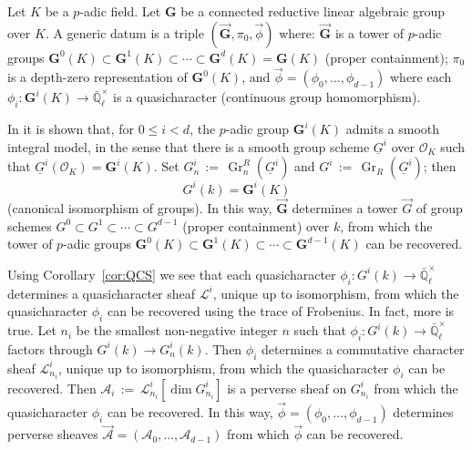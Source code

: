 \documentclass[10pt]{amsart}
\theoremstyle{plain}
\theoremstyle{definition}
\newcommand{\EE}{\mathbb{\bar Q}_\ell}
\newcommand{\OK}{\mathcal{O}_K}
\newcommand{\Fq}{k}
\newcommand{\EEx}{\EE^\times}
\newcommand{\G}{\textbf{G}}
\DeclareMathOperator{\Gr}{Gr}
\newcommand{\ceq}{{\, :=\, }}
\newcommand{\cs}[1]{{\mathcal{#1}}}
\begin{document}
Let $K$ be a $p$-adic field. Let $\G$ be a connected reductive linear algebraic group over $K$. 
A generic datum is a triple $(\vec{\G}, \pi_0, \vec{\phi})$ where: $\vec{\G}$ is a tower of $p$-adic groups $\G^0(K) \subset \G^1(K) \subset \cdots  \subset \G^d(K) = \G(K)$ (proper containment); $\pi_0$ is a depth-zero representation of $\G^0(K)$, and $\vec{\phi} = (\phi_0, \ldots , \phi_{d-1})$ where each $\phi_i : \G^i(K) \to \EEx$ is a quasicharacter (continuous group homomorphism).  


In \cite{yu:03a} it is shown that, for $0 \leq i < d$, the $p$-adic group $\G^i(K)$ admits a smooth integral model, in the sense that there is  a smooth group scheme $\underline{G}^i$ over $\OK$ such that $\underline{G}^i(\OK) = \G^i(K)$.
Set $G^i_n \ceq \Gr^R_n(\underline{G}^i)$ and $G^i \ceq \Gr_R(\underline{G}^i)$; 
then \[G^i(\Fq) = \G^i(K)\] (canonical isomorphism of groups).
In this way, $\vec{\G}$ determines a tower $\vec{G}$ of group schemes $G^0 \subset G^1 \subset \cdots  \subset G^{d-1}$ (proper containment) over $\Fq$, from which the tower of $p$-adic groups
$\G^0(K) \subset \G^1(K) \subset \cdots  \subset \G^{d-1}(K)$ can be recovered.

Using Corollary~\ref{cor:QCS}  we see that each quasicharacter $\phi_i : G^i(\Fq) \to \EEx$ determines a quasicharacter sheaf $\cs{L}^i$, unique up to isomorphism, from which the quasicharacter $\phi_i$ can be recovered using the trace of Frobenius. 
In fact, more is true. Let $n_i$ be the smallest non-negative integer $n$ such that $\phi_i : G^i(\Fq) \to \EEx$ factors through $G^i(\Fq) \to G^i_n(\Fq)$.
Then $\phi_i$ determines a commutative character sheaf $\cs{L}_{n_i}^i$, unique up to isomorphism, from which the quasicharacter $\phi_i$ can be recovered.
Then $\cs{A}_i\ceq \cs{L}_{n_i}^i[\dim G_{n_i}^i]$ is a perverse sheaf on $G_{n_i}^i$ from which the quasicharacter $\phi_i$ can be recovered.
In this way,  $\vec{\phi} = (\phi_0, \ldots , \phi_{d-1})$ determines perverse sheaves $\vec{\cs{A}} = (\cs{A}_0, \ldots , \cs{A}_{d-1})$ from which $\vec{\phi}$ can be recovered. 
\end{document}
